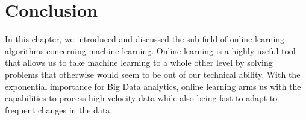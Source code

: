 \section{Conclusion}

In this chapter, we introduced and discussed the sub-field of online learning algorithms concerning machine learning. Online learning is a highly useful tool that allows us to take machine learning to a whole other level by solving problems that otherwise would seem to be out of our technical ability. With the exponential importance for Big Data analytics, online learning arms us with the capabilities to process high-velocity data while also being fast to adapt to frequent changes in the data.